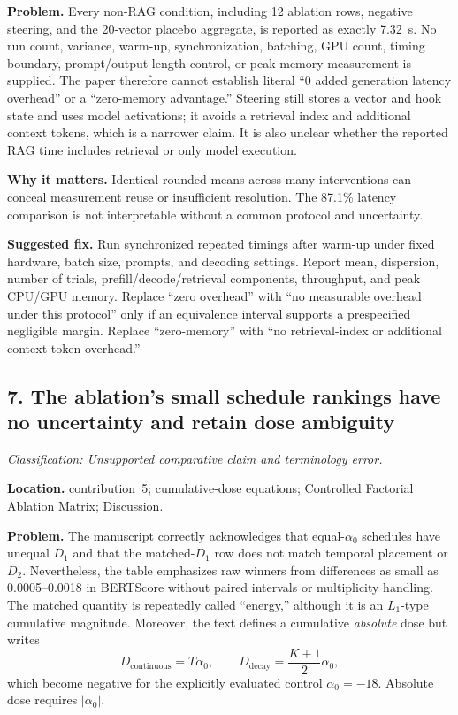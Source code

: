\documentclass[11pt]{article}
\newcommand{\findinglabel}[1]{\textbf{#1}}
\newcommand{\classification}[1]{\textit{Classification: #1.}}
\begin{document}
\findinglabel{Problem.} Every non-RAG condition, including 12 ablation rows, negative steering, and the 20-vector placebo aggregate, is reported as exactly 7.32~s.  No run count, variance, warm-up, synchronization, batching, GPU count, timing boundary, prompt/output-length control, or peak-memory measurement is supplied.  The paper therefore cannot establish literal ``0 added generation latency overhead'' or a ``zero-memory advantage.''  Steering still stores a vector and hook state and uses model activations; it avoids a retrieval index and additional context tokens, which is a narrower claim.  It is also unclear whether the reported RAG time includes retrieval or only model execution.

\findinglabel{Why it matters.} Identical rounded means across many interventions can conceal measurement reuse or insufficient resolution.  The 87.1\% latency comparison is not interpretable without a common protocol and uncertainty.

\findinglabel{Suggested fix.} Run synchronized repeated timings after warm-up under fixed hardware, batch size, prompts, and decoding settings.  Report mean, dispersion, number of trials, prefill/decode/retrieval components, throughput, and peak CPU/GPU memory.  Replace ``zero overhead'' with ``no measurable overhead under this protocol'' only if an equivalence interval supports a prespecified negligible margin.  Replace ``zero-memory'' with ``no retrieval-index or additional context-token overhead.''

\subsection*{7. The ablation's small schedule rankings have no uncertainty and retain dose ambiguity}

\classification{Unsupported comparative claim and terminology error}

\findinglabel{Location.} contribution~5; cumulative-dose equations; Controlled Factorial Ablation Matrix; Discussion.

\findinglabel{Problem.} The manuscript correctly acknowledges that equal-$\alpha_0$ schedules have unequal $D_1$ and that the matched-$D_1$ row does not match temporal placement or $D_2$.  Nevertheless, the table emphasizes raw winners from differences as small as 0.0005--0.0018 in BERTScore without paired intervals or multiplicity handling.  The matched quantity is repeatedly called ``energy,'' although it is an $L_1$-type cumulative magnitude.  Moreover, the text defines a cumulative \emph{absolute} dose but writes
\[
D_{\text{continuous}}=T\alpha_0,
\qquad
D_{\text{decay}}=\frac{K+1}{2}\alpha_0,
\]
which become negative for the explicitly evaluated control $\alpha_0=-18$.  Absolute dose requires $|\alpha_0|$.
\end{document}
